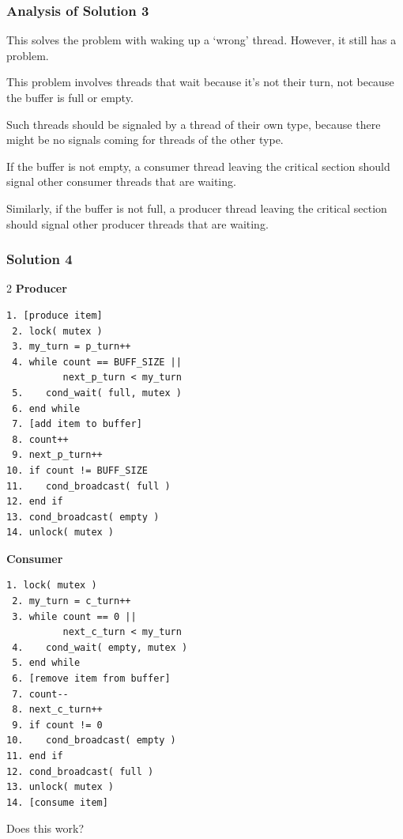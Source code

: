 \begin{frame}
	\frametitle{Analysis of Solution 3}
	This solves the problem with waking up a `wrong' thread.
	However, it still has a problem.

	This problem involves threads that wait because it's not their turn, not because the buffer is full or empty.

	Such threads should be signaled by a thread of their own type, because there might be no signals coming for threads of the other type.

	If the buffer is not empty, a consumer thread leaving the critical section should signal other consumer threads that are waiting.

	Similarly, if the buffer is not full, a producer thread leaving the critical section should signal other producer threads that are waiting.
\end{frame}


\begin{frame}[fragile]
	\frametitle{Solution 4}

	\begin{multicols}{2}
		\small
		\textbf{Producer}
		\begin{Verbatim}[commandchars=\\\{\}]
 1. [produce item]
 2. lock( mutex )
 3. my_turn = p_turn++
 4. while count == BUFF_SIZE ||
          next_p_turn < my_turn
 5.    cond_wait( full, mutex )
 6. end while
 7. [add item to buffer]
 8. count++
 9. next_p_turn++
10. if count != BUFF_SIZE
11.    cond_broadcast( full )
12. end if
13. cond_broadcast( empty )
14. unlock( mutex )
    	\end{Verbatim}
		\columnbreak
		\textbf{Consumer}\vspace{-2em}
		\begin{Verbatim}[commandchars=\\\{\}]
 1. lock( mutex )
 2. my_turn = c_turn++
 3. while count == 0 ||
          next_c_turn < my_turn
 4.    cond_wait( empty, mutex )
 5. end while
 6. [remove item from buffer]
 7. count--
 8. next_c_turn++
 9. if count != 0
10.    cond_broadcast( empty )
11. end if
12. cond_broadcast( full )
13. unlock( mutex )
14. [consume item]
		\end{Verbatim}
	\end{multicols}
	\vspace{-2em}

	Does this work?

\end{frame}

